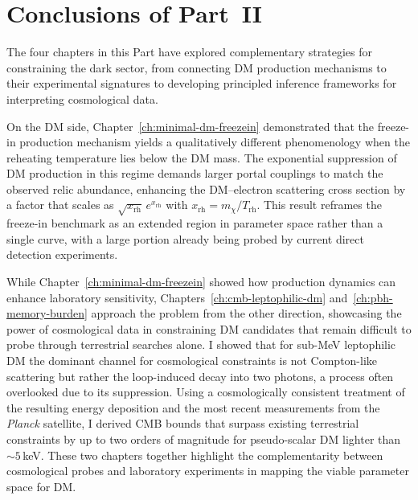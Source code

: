 \chapter*{Conclusions of Part~II}
\label{ch:part2-concl}

The four chapters in this Part have explored complementary strategies for constraining the dark sector, from connecting DM production mechanisms to their experimental signatures to developing principled inference frameworks for interpreting cosmological data.

On the DM side, Chapter~\ref{ch:minimal-dm-freezein} demonstrated that the freeze-in production mechanism yields a qualitatively different phenomenology when the reheating temperature lies below the DM mass. The exponential suppression of DM production in this regime demands larger portal couplings to match the observed relic abundance, enhancing the DM--electron scattering cross section by a factor that scales as $\sqrt{x_\mathrm{rh}}\,e^{x_\mathrm{rh}}$ with $x_\mathrm{rh} = m_\chi/T_\mathrm{rh}$. This result reframes the freeze-in benchmark as an extended region in parameter space rather than a single curve, with a large portion already being probed by current direct detection experiments. 

While Chapter~\ref{ch:minimal-dm-freezein} showed how production dynamics can enhance laboratory sensitivity, Chapters~\ref{ch:cmb-leptophilic-dm} and~\ref{ch:pbh-memory-burden} approach the problem from the other direction, showcasing the power of cosmological data in constraining DM candidates that remain difficult to probe through terrestrial searches alone. 
I showed that for sub-MeV leptophilic DM the dominant channel for cosmological constraints is not Compton-like scattering but rather the loop-induced decay into two photons, a process often overlooked due to its suppression. Using a cosmologically consistent treatment of the resulting energy deposition and the most recent measurements from the \textit{Planck} satellite, I derived CMB bounds that surpass existing terrestrial constraints by up to two orders of magnitude for pseudo-scalar DM lighter than $\sim 5\,$keV. These two chapters together highlight the complementarity between cosmological probes and laboratory experiments in mapping the viable parameter space for DM.

